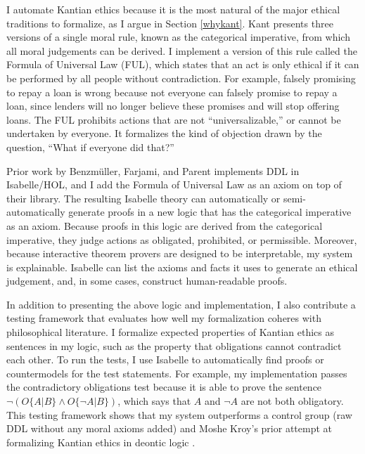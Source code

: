 \begin{isabellebody}
\begin{isamarkuptext}
I automate Kantian ethics because it is the most natural of the major ethical traditions to formalize, as 
I argue in Section \ref{whykant}. 
Kant presents three versions of a single moral rule, known as the categorical imperative, from which 
all moral judgements can be derived. I implement a version of this rule called the Formula of Universal 
Law (FUL), which states that an act is only ethical if it can be performed by all people without contradiction. 
For example, falsely promising to repay a loan is wrong because not everyone can falsely promise to 
repay a loan, since lenders will no longer believe these promises and will stop offering loans. The FUL
prohibits actions that are not ``universalizable,'' or cannot be undertaken by everyone. It formalizes
the kind of objection drawn by the question, ``What if everyone did that?''

Prior work by Benzmüller, Farjami, and Parent \citep{logikey, BFP} implements DDL in Isabelle/HOL, and 
I add the Formula of Universal Law as an axiom on top of their library. The resulting Isabelle theory 
can automatically or semi-automatically generate proofs in a new logic that has the categorical 
imperative as an axiom. Because proofs in this logic are derived from the categorical imperative, 
they judge actions as obligated, prohibited, or permissible. Moreover, because interactive 
theorem provers are designed to be interpretable, my system is explainable. Isabelle can list 
the axioms and facts it uses to generate an ethical judgement, and, in some cases, construct 
human-readable proofs. 

In addition to presenting the above logic and implementation, I also contribute a testing framework 
that evaluates how well my formalization coheres with philosophical literature. I formalize expected 
properties of Kantian ethics as sentences in my logic, such as the property that obligations cannot 
contradict each other. To run the tests, I use Isabelle to automatically find proofs or 
countermodels for the test statements. For example, my implementation passes the contradictory 
obligations test because it is able to prove the sentence $\neg (O\{A|B\} \wedge O\{\neg A | B\})$, 
which says that $A$ and $\neg A$ are not both obligatory. This testing framework shows that my system 
outperforms a control group (raw DDL without any moral axioms added) and 
Moshe Kroy's prior attempt at formalizing Kantian ethics in deontic logic \citep{kroy}.


\end{isamarkuptext}
\end{isabellebody}
